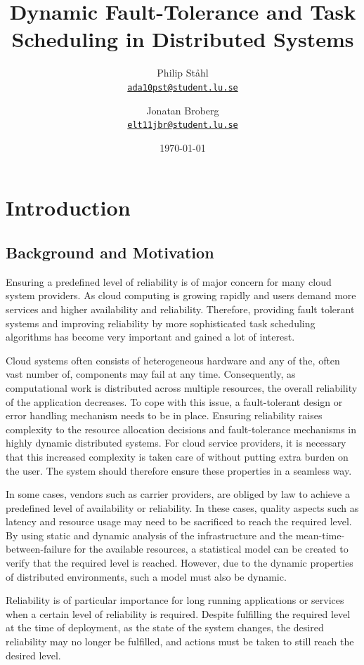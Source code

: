 \documentclass{cslthse-msc}
\author{
	Philip Ståhl \\
	{\normalsize \href{mailto:ada10pst@student.lu.se}{\texttt{ada10pst@student.lu.se}}}
	\and
	Jonatan Broberg \\
    {\normalsize \href{mailto:elt11jbr@student.lu.se}{\texttt{elt11jbr@student.lu.se}}}
}
\title{Dynamic Fault-Tolerance and Task Scheduling in Distributed Systems}
\subtitle{}
\date{\today}
\begin{document}
\makefrontmatter

\chapter{Introduction} \label{ch:introduction} 
\section{Background and Motivation} \label{sec:introduction_backgroud_motivation}
Ensuring a predefined level of reliability is of major concern for many cloud system providers. As cloud computing is growing rapidly and users demand more services and higher availability and reliability. Therefore, providing fault tolerant systems and improving reliability by more sophisticated task scheduling algorithms has become very important and gained a lot of interest.

Cloud systems often consists of heterogeneous hardware and any of the, often vast number of, components may fail at any time. Consequently, as computational work is distributed across multiple resources, the overall reliability of the application decreases. To cope with this issue, a fault-tolerant design or error handling mechanism needs to be in place. Ensuring reliability raises complexity to the resource allocation decisions and fault-tolerance mechanisms in highly dynamic distributed systems. For cloud service providers, it is necessary that this increased complexity is taken care of without putting extra burden on the user. The system should therefore ensure these properties in a seamless way.

In some cases, vendors such as carrier providers, are obliged by law to achieve a predefined level of availability or reliability. In these cases, quality aspects such as latency and resource usage may need to be sacrificed to reach the required level. By using static and dynamic analysis of the infrastructure and the mean-time-between-failure for the available resources, a statistical model can be created to verify that the required level is reached. However, due to the dynamic properties of distributed environments, such a model must also be dynamic. 

Reliability is of particular importance for long running applications or services when a certain level of reliability is required. Despite fulfilling the required level at the time of deployment, as the state of the system changes, the desired reliability may no longer be fulfilled, and actions must be taken to still reach the desired level.
\end{document}
